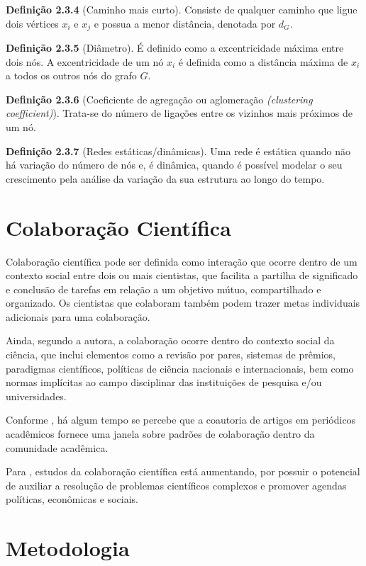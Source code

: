 \documentclass[12pt]{article}
\begin{document}
\noindent \textbf{Definição 2.3.4} (Caminho mais curto). Consiste de qualquer caminho que ligue dois vértices $x_i$ e $x_j$ e possua a menor distância, denotada por $d_G$.

\noindent \textbf{Definição 2.3.5} (Diâmetro). É definido como a excentricidade máxima entre dois nós. A excentricidade de um nó $x_i$ é definida como a distância máxima de $x_i$ a todos os outros nós do grafo $G$.

\noindent \textbf{Definição 2.3.6} (Coeficiente de agregação ou aglomeração \textit{(clustering coefficient)}). Trata-se do número de ligações entre os vizinhos mais próximos de um nó.

\noindent \textbf{Definição 2.3.7} (Redes estáticas/dinâmicas). Uma rede é estática quando não há variação do número de nós e, é dinâmica, quando é possível modelar o seu crescimento pela análise da variação da sua estrutura ao longo do tempo.

\section{Colaboração Científica}

Colaboração científica pode ser definida como interação que ocorre dentro de um contexto social entre dois ou mais cientistas, que facilita a partilha de significado e conclusão de tarefas em relação a um objetivo mútuo, compartilhado e organizado. Os cientistas que colaboram também podem trazer metas individuais adicionais para uma colaboração. \cite{Sonnenwald}

Ainda, segundo a autora, a colaboração ocorre dentro do contexto social da ciência, que inclui elementos como a revisão por pares, sistemas de prêmios, paradigmas científicos, políticas de ciência nacionais e internacionais, bem como normas implícitas ao campo disciplinar das instituições de pesquisa e/ou universidades. 

Conforme \cite{Newman2004}, há algum tempo se percebe que a coautoria de artigos em periódicos acadêmicos fornece uma janela sobre padrões de colaboração dentro da comunidade acadêmica. 

Para \cite{Sonnenwald}, estudos da colaboração científica está aumentando, por possuir o potencial de auxiliar a resolução de problemas científicos complexos e promover agendas políticas, econômicas e sociais. 

\section{Metodologia} 
\end{document}
